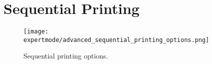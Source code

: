 
\section{Sequential Printing} %
\label{sec:sequential_printing}

\begin{figure}[H]
\centering
\texttt{[image: expertmode/advanced\_sequential\_printing\_options.png]}
\caption{Sequential printing options.}
\label{fig:advanced_sequential_printing_options}
\end{figure}


